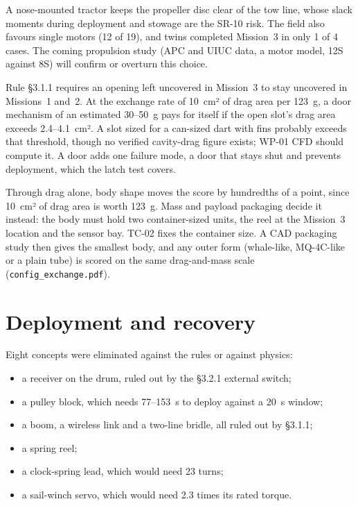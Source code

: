 \documentclass[final]{dbfdoc}
\begin{document}

A nose-mounted tractor keeps the propeller disc clear of the tow line, whose slack moments during deployment and stowage are the SR-10 risk. The field also favours single motors (12 of 19), and twins completed Mission~3 in only 1 of 4 cases. The coming propulsion study (APC and UIUC data, a motor model, 12S against 8S) will confirm or overturn this choice.


Rule §3.1.1 requires an opening left uncovered in Mission~3 to stay uncovered in Missions~1 and~2. At the exchange rate of 10~cm² of drag area per 123~g, a door mechanism of an estimated 30--50~g pays for itself if the open slot's drag area exceeds 2.4--4.1~cm². A slot sized for a can-sized dart with fins probably exceeds that threshold, though no verified cavity-drag figure exists; WP-01 CFD should compute it. A door adds one failure mode, a door that stays shut and prevents deployment, which the latch test covers.


Through drag alone, body shape moves the score by hundredths of a point, since 10~cm² of drag area is worth 123~g. Mass and payload packaging decide it instead: the body must hold two container-sized units, the reel at the Mission~3 location and the sensor bay. TC-02 fixes the container size. A CAD packaging study then gives the smallest body, and any outer form (whale-like, MQ-4C-like or a plain tube) is scored on the same drag-and-mass scale (\texttt{config\_exchange.pdf}).


\section{Deployment and recovery}
Eight concepts were eliminated against the rules or against physics:
\begin{itemize}
\item a receiver on the drum, ruled out by the §3.2.1 external switch;
\item a pulley block, which needs 77--153~s to deploy against a 20~s window;
\item a boom, a wireless link and a two-line bridle, all ruled out by §3.1.1;
\item a spring reel;
\item a clock-spring lead, which would need 23 turns;
\item a sail-winch servo, which would need 2.3 times its rated torque.
\end{itemize}
\end{document}
